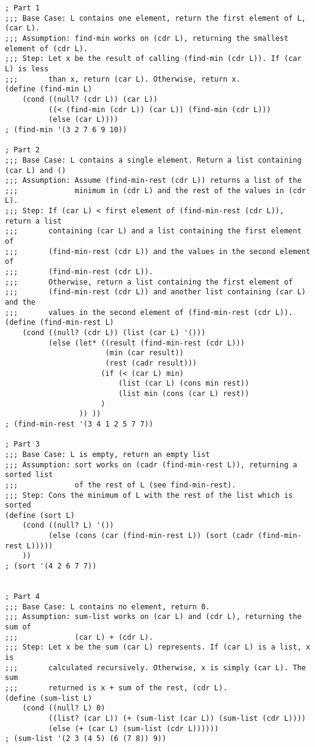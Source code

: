 \documentclass[10pt]{article}
\begin{document}
\begin{verbatim}
; Part 1
;;; Base Case: L contains one element, return the first element of L, (car L).
;;; Assumption: find-min works on (cdr L), returning the smallest element of (cdr L).
;;; Step: Let x be the result of calling (find-min (cdr L)). If (car L) is less 
;;;       than x, return (car L). Otherwise, return x.
(define (find-min L)
    (cond ((null? (cdr L)) (car L))
          ((< (find-min (cdr L)) (car L)) (find-min (cdr L)))
          (else (car L))))
; (find-min '(3 2 7 6 9 10))
          
; Part 2
;;; Base Case: L contains a single element. Return a list containing (car L) and ()
;;; Assumption: Assume (find-min-rest (cdr L)) returns a list of the 
;;;             minimum in (cdr L) and the rest of the values in (cdr L).
;;; Step: If (car L) < first element of (find-min-rest (cdr L)), return a list 
;;;       containing (car L) and a list containing the first element of 
;;;       (find-min-rest (cdr L)) and the values in the second element of 
;;;       (find-min-rest (cdr L)). 
;;;       Otherwise, return a list containing the first element of 
;;;       (find-min-rest (cdr L)) and another list containing (car L) and the
;;;       values in the second element of (find-min-rest (cdr L)). 
(define (find-min-rest L)
    (cond ((null? (cdr L)) (list (car L) '()))
          (else (let* ((result (find-min-rest (cdr L)))
                       (min (car result))
                       (rest (cadr result)))
                      (if (< (car L) min)
                          (list (car L) (cons min rest))
                          (list min (cons (car L) rest))
                      )
                 )) ))
; (find-min-rest '(3 4 1 2 5 7 7))

; Part 3
;;; Base Case: L is empty, return an empty list
;;; Assumption: sort works on (cadr (find-min-rest L)), returning a sorted list
;;;             of the rest of L (see find-min-rest).
;;; Step: Cons the minimum of L with the rest of the list which is sorted
(define (sort L)
    (cond ((null? L) '())
          (else (cons (car (find-min-rest L)) (sort (cadr (find-min-rest L)))))
    ))
; (sort '(4 2 6 7 7))


; Part 4
;;; Base Case: L contains no element, return 0.
;;; Assumption: sum-list works on (car L) and (cdr L), returning the sum of 
;;;             (car L) + (cdr L).
;;; Step: Let x be the sum (car L) represents. If (car L) is a list, x is 
;;;       calculated recursively. Otherwise, x is simply (car L). The sum 
;;;       returned is x + sum of the rest, (cdr L).
(define (sum-list L)
    (cond ((null? L) 0)
          ((list? (car L)) (+ (sum-list (car L)) (sum-list (cdr L))))
          (else (+ (car L) (sum-list (cdr L))))))
; (sum-list '(2 3 (4 5) (6 (7 8)) 9))


\end{verbatim}
\end{document}
